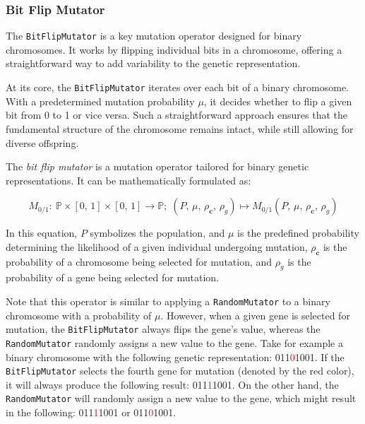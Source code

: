 
\subsubsection{Bit Flip Mutator}
\label{sec:keen:op:mut:bit_flip}

  The \texttt{BitFlipMutator} is a key mutation operator designed for binary chromosomes. It works by flipping individual bits in a chromosome, offering a straightforward way to add variability to the genetic representation.

  At its core, the \texttt{BitFlipMutator} iterates over each bit of a binary 
  chromosome. With a predetermined mutation probability \( \mu \), it decides 
  whether to flip a given bit from 0 to 1 or vice versa. Such a straightforward 
  approach ensures that the fundamental structure of the chromosome remains 
  intact, while still allowing for diverse offspring.

  \begin{definition}
    The \emph{bit flip mutator} is a mutation operator tailored for binary 
    genetic representations. It can be mathematically formulated as:

    \begin{equation}
      M_{0/1} :\: \mathbb{P} \times [0,\, 1] \times [0,\, 1] \to \mathbb{P};\;
      (P,\, \mu,\, \rho_\mathbf{c},\, \rho_g) 
        \mapsto M_{0/1}(P,\, \mu,\, \rho_\mathbf{c},\, \rho_g)
    \end{equation}

    In this equation, \(P\) symbolizes the population, and \(\mu\) is the 
    predefined probability determining the likelihood of a given individual
    undergoing mutation, \(\rho_\mathbf{c}\) is the probability of a chromosome
    being selected for mutation, and \(\rho_g\) is the probability of a gene
    being selected for mutation.
  \end{definition}

  Note that this operator is similar to applying a \texttt{RandomMutator} to a 
  binary chromosome with a probability of \(\mu\). However, when a given
  gene is selected for mutation, the \texttt{BitFlipMutator} always flips the
  gene's value, whereas the \texttt{RandomMutator} randomly assigns a new value
  to the gene. Take for example a binary chromosome with the following genetic
  representation: 011\textcolor{red}{0}1001. If the \texttt{BitFlipMutator}
  selects the fourth gene for mutation (denoted by the red color), it will
  always produce the following result: 011\textcolor{red}{1}1001. On the other
  hand, the \texttt{RandomMutator} will randomly assign a new value to the
  gene, which might result in the following: 011\textcolor{red}{1}1001 or
  011\textcolor{red}{0}1001.
